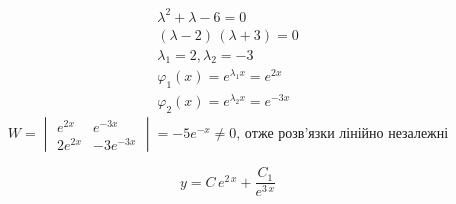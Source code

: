 \documentclass[../rgr_2.tex]{subfiles}
\begin{document}
\Solution

\begin{align}
	\lambda^2+\lambda-6=0 \\
	\left(\lambda-2\right)\,\left(\lambda+3\right)=0 \\
	\lambda_1 = 2,
	\lambda_2 = -3 \\
	\varphi_1(x)=e^{\lambda_1 x}=e^{2x} \\
	\varphi_2(x)=e^{\lambda_2 x}=e^{-3x}
\end{align}
\begin{equation}
	W=
	\begin{vmatrix}
		e^{2x}	&e^{-3x}	\\
		2e^{2x}	&-3e^{-3x}
	\end{vmatrix}
	=-5e^{-x} \neq 0 \text{,~отже розв'язки лінійно незалежні}
\end{equation}

\begin{equation}
	y=C\,{e}^{2\,x}+\dfrac{C_{1}}{{e}^{3\,x}}
\end{equation}

\Answer{
	<++>
}
\end{document}
